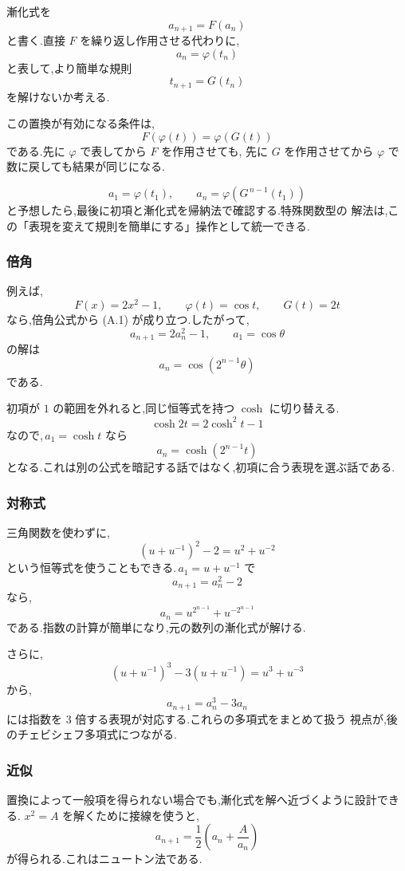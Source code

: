 漸化式を
\[
  a_{n+1}=F(a_n)
\]
と書く.直接 $F$ を繰り返し作用させる代わりに,
\[
  a_n=\varphi(t_n)
\]
と表して,より簡単な規則
\[
  t_{n+1}=G(t_n)
\]
を解けないか考える.

この置換が有効になる条件は,
\[
  F(\varphi(t))=\varphi(G(t))
  \tag{A.1}
\]
である.先に $\varphi$ で表してから $F$ を作用させても,
先に $G$ を作用させてから $\varphi$ で数に戻しても結果が同じになる.

\begin{mdquote}
\[
  a_1=\varphi(t_1),
  \qquad
  a_n=\varphi\left(G^{\,n-1}(t_1)\right)
\]
と予想したら,最後に初項と漸化式を帰納法で確認する.特殊関数型の
解法は,この「表現を変えて規則を簡単にする」操作として統一できる.
\end{mdquote}

\subsubsection{倍角}

例えば,
\[
  F(x)=2x^2-1,
  \qquad
  \varphi(t)=\cos t,
  \qquad
  G(t)=2t
\]
なら,倍角公式から (A.1) が成り立つ.したがって,
\[
  a_{n+1}=2a_n^2-1,
  \qquad
  a_1=\cos\theta
\]
の解は
\[
  a_n=\cos(2^{n-1}\theta)
\]
である.

初項が $1$ の範囲を外れると,同じ恒等式を持つ $\cosh$ に切り替える.
\[
  \cosh 2t=2\cosh^2t-1
\]
なので,\,$a_1=\cosh t$ なら
\[
  a_n=\cosh(2^{n-1}t)
\]
となる.これは別の公式を暗記する話ではなく,初項に合う表現を選ぶ話である.

\subsubsection{対称式}

三角関数を使わずに,
\[
  (u+u^{-1})^2-2=u^2+u^{-2}
  \tag{A.2}
\]
という恒等式を使うこともできる.\,$a_1=u+u^{-1}$ で
\[
  a_{n+1}=a_n^2-2
\]
なら,
\[
  a_n=u^{2^{n-1}}+u^{-2^{n-1}}
\]
である.指数の計算が簡単になり,元の数列の漸化式が解ける.

さらに,
\[
  (u+u^{-1})^3-3(u+u^{-1})=u^3+u^{-3}
\]
から,
\[
  a_{n+1}=a_n^3-3a_n
\]
には指数を $3$ 倍する表現が対応する.これらの多項式をまとめて扱う
視点が,後のチェビシェフ多項式につながる.

\subsubsection{近似}

置換によって一般項を得られない場合でも,漸化式を解へ近づくように設計できる.
$x^2=A$ を解くために接線を使うと,
\[
  a_{n+1}=\frac12\left(a_n+\frac{A}{a_n}\right)
  \tag{A.3}
\]
が得られる.これはニュートン法である.

